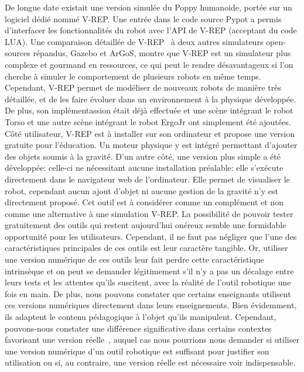                 {De longue date existait une version simulée du Poppy humanoide, portée sur un logiciel dédié nommé V-REP. Une entrée dans le code source Pypot a permis d'interfacer les fonctionnalités du robot  avec l'API de V-REP (acceptant du code LUA). 
                Une comparaison détaillée de V-REP~ à deux autres simulateurs open-sources répandus, Gazebo et ArGoS, montre que  V-REP est un simulateur plus complexe et gourmand en ressources, ce qui peut le rendre désavantageux si l’on cherche à simuler le comportement de plusieurs robots en même temps. Cependant, V-REP permet de modéliser de nouveaux robots de manière très détaillée, et de les faire évoluer dans un environnement à la physique développée.}%
                De plus, son implémentassion était déjà effectuée et une scène intégrant le robot Torso et une autre scène intégrant le robot ErgoJr ont simplement été ajoutées. 
                Côté utilisateur, V-REP est à installer sur son ordinateur et propose une version gratuite pour l'éducation. Un moteur physique y est intégré permettant d'ajouter des objets soumis à la gravité.
                D'un autre côté, une version plus simple a été développée: celle-ci ne nécessitant aucune installation préalable: elle s'exécute directement dans le navigateur web de l'ordinateur. Elle permet de visualiser le robot, cependant aucun ajout d'objet ni aucune gestion de la gravité n'y est directement proposé. Cet outil est à considérer comme un complément et non comme une alternative à une simulation V-REP.
                La possibilité de pouvoir tester gratuitement des outils qui restent aujourd'hui onéreux semble une formidable opportunité pour les utilisateurs. Cependant, il ne faut pas négliger que l'une des caractéristiques principales de ces outils est leur caractère tangible. Or, utiliser une version numérique de ces outils leur fait perdre cette caractéristique intrinsèque et on peut se demander légitimement s'il n'y a pas un décalage entre leurs tests et les attentes qu'ils suscitent, avec la réalité de l'outil robotique une fois en main. De plus, nous pouvons constater que certains enseignants utilisent ces versions numériques directement dans leurs enseignements. Bien évidemment, ils adaptent le contenu pédagogique à l'objet qu'ils manipulent. Cependant, pouvons-nous constater une différence significative dans certains contextes favorisant une version réelle~, auquel cas nous pourrions nous demander si utiliser une version numérique d'un outil robotique est suffisant pour justifier son utilisation ou si, au contraire, une version réelle est nécessaire voir indispensable. 
